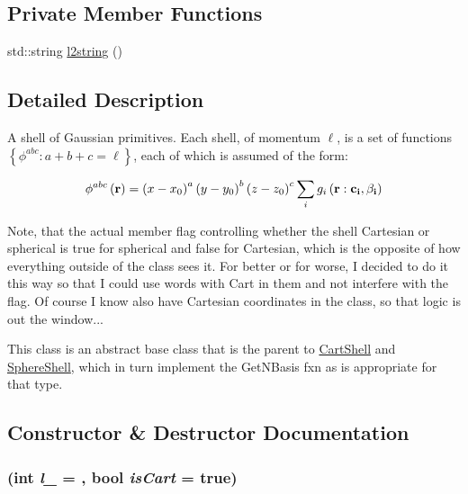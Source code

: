 \subsection*{Private Member Functions}
\begin{DoxyCompactItemize}
\item 
std::string \hyperlink{classJKBuilder_1_1Shell_abf69d46e0ac3418b1e7926c9e18def95}{l2string} ()
\end{DoxyCompactItemize}


\subsection{Detailed Description}
A shell of Gaussian primitives. Each shell, of momentum $\ell$, is a set of functions $\left\lbrace\phi^{abc}:a+b+c=\ell\right\rbrace$, each of which is assumed of the form:

\[ \phi^{abc}\left(\bf{r}\right)=\left(x-x_0\right)^a\left(y-y_0\right)^b\left(z-z_0\right)^c\sum_i g_i\left(\bf{r}:c_i,\beta_i\right) \]

Note, that the actual member flag controlling whether the shell Cartesian or spherical is true for spherical and false for Cartesian, which is the opposite of how everything outside of the class sees it. For better or for worse, I decided to do it this way so that I could use words with Cart in them and not interfere with the flag. Of course I know also have Cartesian coordinates in the class, so that logic is out the window...

This class is an abstract base class that is the parent to \hyperlink{classJKBuilder_1_1CartShell}{CartShell} and \hyperlink{classJKBuilder_1_1SphereShell}{SphereShell}, which in turn implement the GetNBasis fxn as is appropriate for that type. 

\subsection{Constructor \& Destructor Documentation}
\hypertarget{classJKBuilder_1_1Shell_aaf2d048844f6fbd887a4d915fd25e711}{
\subsubsection[{Shell}]{ (int {\em l\_\-} = {}, \/  bool {\em isCart} = {\ttfamily true})}}
\label{classJKBuilder_1_1Shell_aaf2d048844f6fbd887a4d915fd25e711}



